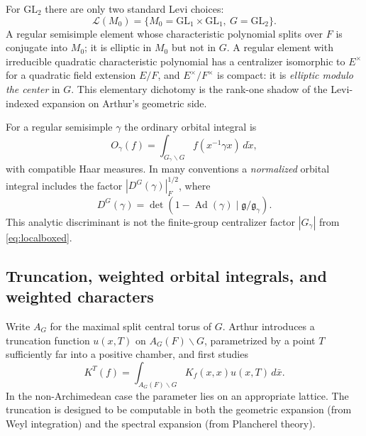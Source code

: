 \documentclass[12pt]{article}
\theoremstyle{remark}
\begin{document}
For $\mathrm{GL}_2$ there are only two standard Levi choices:
\[
 \mathcal L(M_0)=\{M_0=\mathrm{GL}_1\times\mathrm{GL}_1,
                     \ G=\mathrm{GL}_2\}.
\]
A regular semisimple element whose characteristic polynomial splits
over $F$ is conjugate into $M_0$; it is elliptic in $M_0$ but not
in $G$.  A regular element with irreducible quadratic characteristic
polynomial has a centralizer isomorphic to $E^\times$ for a
quadratic field extension $E/F$, and $E^\times/F^\times$ is compact:
it is \emph{elliptic modulo the center} in $G$.
This elementary dichotomy is the rank-one shadow of the
Levi-indexed expansion on Arthur's geometric side.

For a regular semisimple $\gamma$ the ordinary orbital integral is
\begin{equation}\label{eq:padic-orbital}
 O_\gamma(f)=\int_{G_\gamma\backslash G}
       f(x^{-1}\gamma x)\,d\dot x,
\end{equation}
with compatible Haar measures.  In many conventions a
\emph{normalized} orbital integral includes the factor
$|D^G(\gamma)|_F^{1/2}$, where
\[
 D^G(\gamma)=\det(1-\operatorname{Ad}(\gamma)
                     \mid\mathfrak g/\mathfrak g_\gamma).
\]
This analytic discriminant is not the finite-group centralizer
factor $|G_\gamma|$ from \eqref{eq:localboxed}.

\subsection{Truncation, weighted orbital integrals, and weighted characters}
Write $A_G$ for the maximal split central torus of $G$.  Arthur
introduces a truncation function $u(x,T)$ on $A_G(F)\backslash G$,
parametrized by a point $T$ sufficiently far into a positive chamber,
and first studies
\begin{equation}\label{eq:padic-trunc}
 K^T(f)=\int_{A_G(F)\backslash G}
         K_f(x,x)u(x,T)\,d\bar x.
\end{equation}
In the non-Archimedean case the parameter lies on an appropriate
lattice. The truncation is designed to be computable in both
the geometric expansion (from Weyl integration) and the spectral
expansion (from Plancherel theory).
\end{document}
